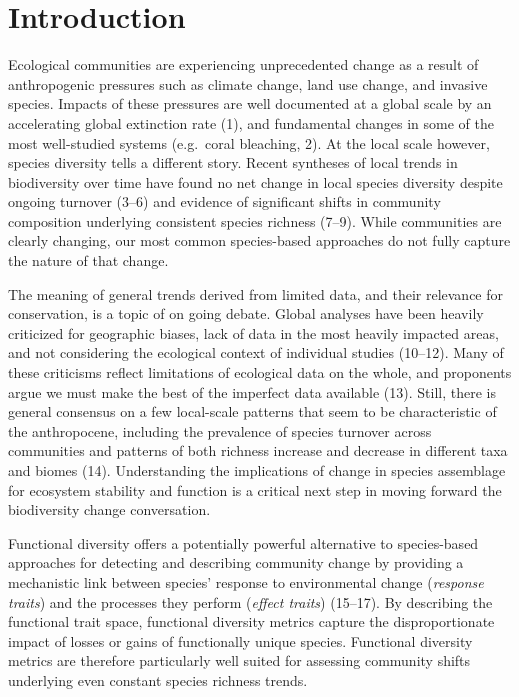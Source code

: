 \documentclass{article}
\begin{document}
\hypertarget{introduction}{%
\section{Introduction}\label{introduction}}

Ecological communities are experiencing unprecedented change as a result
of anthropogenic pressures such as climate change, land use change, and
invasive species. Impacts of these pressures are well documented at a
global scale by an accelerating global extinction rate (1), and
fundamental changes in some of the most well-studied systems (e.g.~coral
bleaching, 2). At the local scale however, species diversity tells a
different story. Recent syntheses of local trends in biodiversity over
time have found no net change in local species diversity despite ongoing
turnover (3--6) and evidence of significant shifts in community
composition underlying consistent species richness (7--9). While
communities are clearly changing, our most common species-based
approaches do not fully capture the nature of that change.

The meaning of general trends derived from limited data, and their
relevance for conservation, is a topic of on going debate. Global
analyses have been heavily criticized for geographic biases, lack of
data in the most heavily impacted areas, and not considering the
ecological context of individual studies (10--12). Many of these
criticisms reflect limitations of ecological data on the whole, and
proponents argue we must make the best of the imperfect data available
(13). Still, there is general consensus on a few local-scale patterns
that seem to be characteristic of the anthropocene, including the
prevalence of species turnover across communities and patterns of both
richness increase and decrease in different taxa and biomes (14).
Understanding the implications of change in species assemblage for
ecosystem stability and function is a critical next step in moving
forward the biodiversity change conversation.

Functional diversity offers a potentially powerful alternative to
species-based approaches for detecting and describing community change
by providing a mechanistic link between species' response to
environmental change (\emph{response traits}) and the processes they
perform (\emph{effect traits}) (15--17). By describing the functional
trait space, functional diversity metrics capture the disproportionate
impact of losses or gains of functionally unique species. Functional
diversity metrics are therefore particularly well suited for assessing
community shifts underlying even constant species richness trends.
\end{document}

